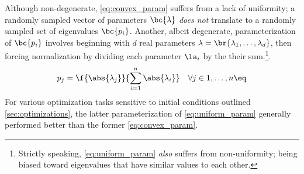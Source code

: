 \documentclass[aps, 10pt, english, twoside, pra, nofootinbib, tightenlines, longbibliography, superscriptaddress]{revtex4-1}
\begin{document}
    Although non-degenerate, \cref{eq:convex_param} suffers from a lack of uniformity; a randomly sampled vector of parameters $\bc{\lambda}$ \textit{does not} translate to a randomly sampled set of eigenvalues $\bc{p_i}$. Another, albeit degenerate, parameterization of $\bc{p_i}$ involves beginning with $d$ real parameters $\lambda = \br{\lambda_1, \ldots, \lambda_d}$, then forcing normalization by dividing each parameter $\la_i$ by the their sum.\footnote{Strictly speaking, \cref{eq:uniform_param} \textit{also} suffers from non-uniformity; being biased toward eigenvalues that have similar values to each other.}.
    \[ p_j = \f{\abs{\lambda_j}}{\sum_{i=1}^{n} \abs{\lambda_i}} \quad \forall j \in 1, \ldots, n \eq \label{eq:uniform_param} \]
    For various optimization tasks sensitive to initial conditions outlined \cref{sec:optimizations}, the latter parameterization of \cref{eq:uniform_param} generally performed better than the former \cref{eq:convex_param}.
\end{document}
